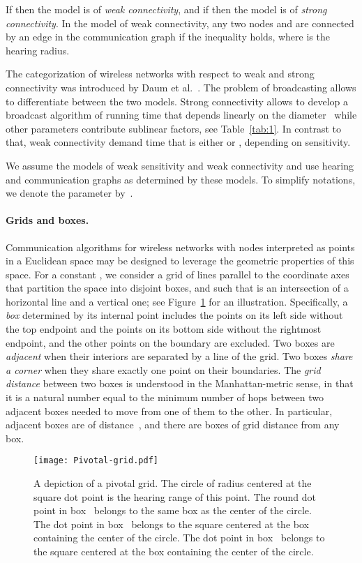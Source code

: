 \documentclass[11pt]{article}
\newcommand{\BBB}{\vspace*{-\bigskipamount}}
\newcommand{\Paragraph}[1]{\BBB\paragraph{#1}}
\begin{document}
If  then the model is of \emph{weak connectivity}, and if  then the model is of  \emph{strong connectivity}.
In the model of weak connectivity, any two nodes  and  are connected by an edge in the communication graph if the inequality  holds, where  is the hearing radius.

The categorization of wireless networks with respect to weak and strong connectivity was introduced by Daum et al.~\cite{DGKN13}.
The problem of broadcasting allows to differentiate between the two models.
Strong connectivity allows to develop a broadcast algorithm of running time that depends linearly on the diameter~ while other parameters contribute sublinear factors, see Table~\ref{tab:1}.
In contrast to that, weak connectivity demand time that is either  or , depending on sensitivity.

We assume  the models of weak sensitivity and weak connectivity and use hearing and communication graphs as determined by these models.
To simplify notations, we denote the parameter  by~.



\Paragraph{Grids and boxes.}


Communication algorithms for wireless networks with nodes interpreted as points in a Euclidean space may be designed to leverage the geometric properties of this space.
For a constant , we consider a grid of lines parallel to the coordinate axes that partition the space into  disjoint boxes, and such that  is an intersection of a horizontal line and a vertical one; see Figure~\ref{fig:grid} for an illustration.
Specifically, a \emph{box} determined by its internal point includes the points on its left side without the top endpoint and the points on its bottom side without the rightmost endpoint, and the other points on the boundary are excluded.
Two boxes are \emph{adjacent} when their interiors are separated by a line of the grid.
Two boxes \emph{share a corner} when they share exactly one point on their boundaries.
The \emph{grid distance} between two boxes is understood in the Manhattan-metric sense, in that it is a natural number equal to the minimum number of hops between two adjacent boxes needed to move from one of them to the other.
In particular, adjacent boxes are of distance~, and there are  boxes of grid distance  from any box.





\begin{figure}[t]
\begin{center}
\texttt{[image: Pivotal-grid.pdf]}

\caption{\label{fig:grid} 
A depiction of a pivotal grid.
The circle of radius  centered at the square dot point is the hearing range of this point.
The round dot point in box~ belongs to the same box as the center of the circle.
The dot point in box~ belongs to the  square centered at the box containing the center of the circle.
The dot point in box~ belongs to the  square centered at the box containing the center of the circle.}
\end{center}
\end{figure}
\end{document}
